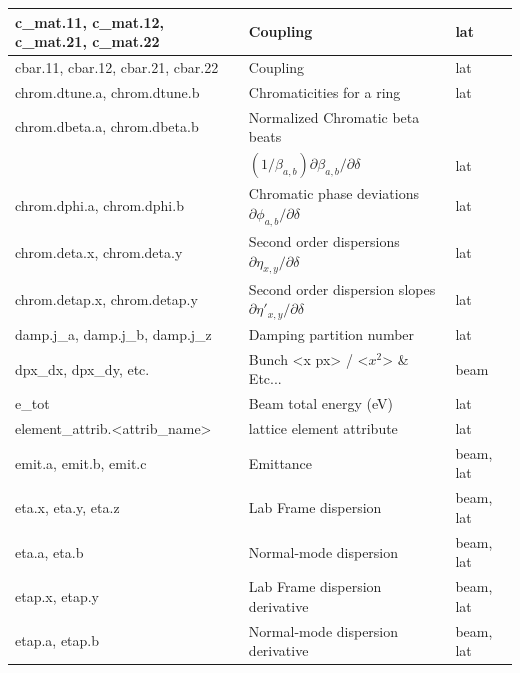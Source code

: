 {\begin{longtable}{lll}
  c_mat.11, c_mat.12, c_mat.21, c_mat.22
                                      & Coupling                                      & lat       \\ \hline 

  cbar.11, cbar.12, cbar.21, cbar.22
                                      & Coupling                                      & lat       \\ \hline 

  chrom.dtune.a, chrom.dtune.b        & Chromaticities for a ring                       & lat       \\ \hline
  chrom.dbeta.a, chrom.dbeta.b        & Normalized Chromatic beta beats  \\ 
  									  &$(1/\beta_{a,b})\partial\beta_{a,b}/\partial\delta$			& lat       \\ \hline
  chrom.dphi.a, chrom.dphi.b        & Chromatic phase deviations $\partial\phi_{a,b}/\partial\delta$		& lat       \\ \hline
  chrom.deta.x, chrom.deta.y        & Second order dispersions $\partial\eta_{x,y}/\partial\delta$		& lat       \\ \hline
  chrom.detap.x, chrom.detap.y        & Second order dispersion slopes $\partial\eta'_{x,y}/\partial\delta$		& lat       \\ \hline

  damp.j_a, damp.j_b, damp.j_z        & Damping partition number                      & lat       \\ \hline

  dpx\_dx, dpx\_dy, etc.              & Bunch <x px> / <$x^2$> \& Etc...              & beam      \\ \hline 

  e\_tot                              & Beam total energy (eV)                        & lat       \\ \hline

  element\_attrib.<attrib\_name>      & lattice element attribute                     & lat       \\ \hline

  emit.a, emit.b, emit.c              & Emittance                                     & beam, lat \\ \hline

  eta.x, eta.y, eta.z                 & Lab Frame dispersion                          & beam, lat \\ \hline 
  eta.a, eta.b                        & Normal-mode dispersion                        & beam, lat \\ \hline 
  etap.x, etap.y                      & Lab Frame dispersion derivative               & beam, lat \\ \hline 
  etap.a, etap.b                      & Normal-mode dispersion derivative             & beam, lat \\ \hline 


\end{longtable}}

